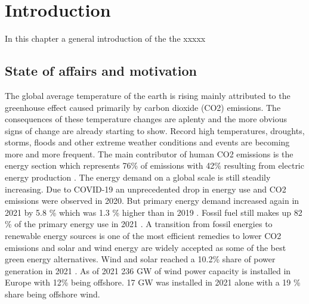 \section{Introduction} \label{sec:intro}
In this chapter a general introduction of the the xxxxx

\subsection{State of affairs and motivation} \label{sec:intro_stateofaffairs}
The global average temperature of the earth is rising mainly attributed to the greenhouse effect caused primarily by carbon dioxide (CO2) emissions. The consequences of these temperature changes are aplenty and the more obvious signs of change are already starting to show. Record high temperatures, droughts, storms, floods and other extreme weather conditions and events are becoming more and more frequent. The main contributor of human CO2 emissions is the energy section which represents 76\% of emissions with 42\% resulting from electric energy production \cite{wri2018}. The energy demand on a global scale is still steadily increasing. Due to COVID-19 an unprecedented drop in energy use and CO2 emissions were observed in 2020. But primary energy demand increased again in 2021 by 5.8 \% which was 1.3 \% higher than in 2019 \cite{bp2022}. Fossil fuel still makes up 82 \% of the primary energy use in 2021 \cite{bp2022}. A transition from fossil energies to renewable energy sources is one of the most efficient remedies to lower CO2 emissions and solar and wind energy are widely accepted as some of the best green energy alternatives. Wind and solar reached a 10.2\% share of power generation in 2021 \cite{bp2022}. As of 2021 236 GW of wind power capacity is installed in Europe with 12\% being offshore. 17 GW was installed in 2021 alone with a 19 \% share being offshore wind\cite{Sesto1992}. \\


